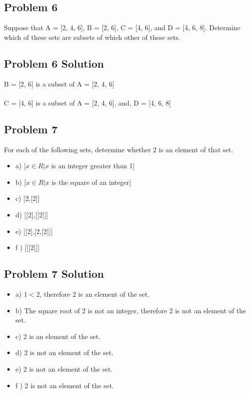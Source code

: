\documentclass[11pt]{article}
\begin{document}
\subsection{Problem 6}

Suppose that A = [2, 4, 6], B = [2, 6], C = [4, 6], and D = [4, 6, 8]. Determine which of these sets are subsets of which other of these sets.

\subsection{Problem 6 Solution}

 B = [2, 6] is a subset of A = [2, 4, 6] \\
\\
 C = [4, 6] is a subset of A = [2, 4, 6], and, D = [4, 6, 8] \\

\subsection{Problem 7}

For each of the following sets, determine whether 2 is an element of that set.

\begin{itemize}
\item a) [$x \in R | x$ is an integer greater than 1]
\item b) [$x \in R | x$ is the square of an integer]
\item c) [2,[2]]
\item d) [[2],[[2]]]
\item e) [[2],[2,[2]]]
\item f ) [[[2]]]
\end{itemize}

\subsection{Problem 7 Solution}

\begin{itemize}
\item a) $1 < 2$, therefore 2 is an element of the set.
\item b) The square root of 2 is not an integer, therefore 2 is not an element of the set.
\item c) 2 is an element of the set.
\item d) 2 is not an element of the set.
\item e) 2 is not an element of the set.
\item f ) 2 is not an element of the set.
\end{itemize}
\end{document}
